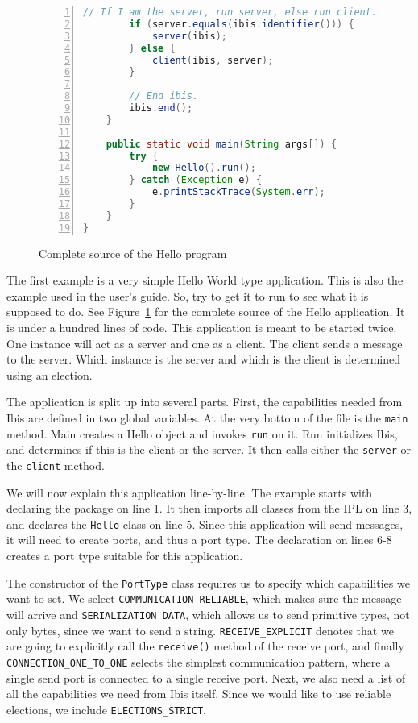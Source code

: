 \begin{figure}[p]
\begin{lstlisting}[language=Java,numbers=left, numbersep=3pt]
        // If I am the server, run server, else run client.
        if (server.equals(ibis.identifier())) {
            server(ibis);
        } else {
            client(ibis, server);
        }

        // End ibis.
        ibis.end();
    }

    public static void main(String args[]) {
        try {
            new Hello().run();
        } catch (Exception e) {
            e.printStackTrace(System.err);
        }
    }
}
\end{lstlisting}
\caption{Complete source of the Hello program}
\label{hello_source}
\end{figure}

The first example is a very simple Hello World type application. This is
also the example used in the user's guide. So, try to get it to run to
see what it is supposed to do. See Figure~\ref{hello_source} for the
complete source of the Hello application. It is under a hundred lines of
code. This application is meant to be started twice. One instance will
act as a server and one as a client. The client sends a message to the
server. Which instance is the server and which is the client is
determined using an election.

The application is split up into several parts. First, the capabilities
needed from Ibis are defined in two global variables. At the very bottom
of the file is the \texttt{main} method. Main creates a Hello object
and invokes \texttt{run} on it. Run initializes Ibis, and
determines if this is the client or the server. It then calls either the
\texttt{server} or the \texttt{client} method.

We will now explain this application line-by-line. The example starts
with declaring the package on line 1. It then imports all classes from
the IPL on line 3, and declares the \texttt{Hello} class on line 5. Since
this application will send messages, it will need to create ports, and
thus a port type. The declaration on lines 6-8 creates a port type
suitable for this application. 

The constructor of the \texttt{PortType} class requires us to specify
which capabilities we want to set. We select
\texttt{COMMUNICATION\_RELIABLE}, which makes sure the message will arrive
and \texttt{SERIALIZATION\_DATA}, which allows us to send primitive types,
not only bytes, since we want to send a string. \texttt{RECEIVE\_EXPLICIT}
denotes that we are going to explicitly call the \texttt{receive()} method of
the receive port, and finally \texttt{CONNECTION\_ONE\_TO\_ONE} selects
the simplest communication pattern, where a single send port is connected
to a single receive port.
Next, we also need a list of all the capabilities we need from Ibis
itself. Since we would like to use reliable elections, we include
\texttt{ELECTIONS\_STRICT}.

